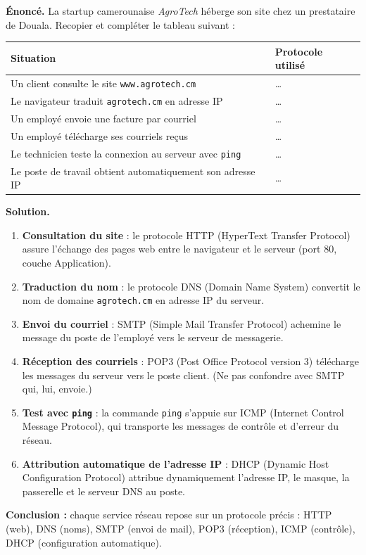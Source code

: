 \documentclass[11pt]{article}
\newcommand{\cle}[1]{{\popxbold\color{popdark}#1}}
\begin{document}
\begin{exoresolu}
\textbf{Énoncé.} La startup camerounaise \emph{AgroTech} héberge son site chez un prestataire de Douala. Recopier et compléter le tableau suivant :
\begin{center}
\begin{tabularx}{\linewidth}{|l|X|}
\hline
\rowcolor{popblueL} \textbf{Situation} & \textbf{Protocole utilisé} \\
\hline Un client consulte le site \texttt{www.agrotech.cm} & \ldots \\
\hline Le navigateur traduit \texttt{agrotech.cm} en adresse IP & \ldots \\
\hline Un employé envoie une facture par courriel & \ldots \\
\hline Un employé télécharge ses courriels reçus & \ldots \\
\hline Le technicien teste la connexion au serveur avec \texttt{ping} & \ldots \\
\hline Le poste de travail obtient automatiquement son adresse IP & \ldots \\
\hline
\end{tabularx}
\end{center}
\tcblower
\textbf{Solution.}
\begin{enumerate}
\item \textbf{Consultation du site} : le protocole \cle{HTTP} (HyperText Transfer Protocol) assure l'échange des pages web entre le navigateur et le serveur (port 80, couche Application).
\item \textbf{Traduction du nom} : le protocole \cle{DNS} (Domain Name System) convertit le nom de domaine \texttt{agrotech.cm} en adresse IP du serveur.
\item \textbf{Envoi du courriel} : \cle{SMTP} (Simple Mail Transfer Protocol) achemine le message du poste de l'employé vers le serveur de messagerie.
\item \textbf{Réception des courriels} : \cle{POP3} (Post Office Protocol version 3) télécharge les messages du serveur vers le poste client. (Ne pas confondre avec SMTP qui, lui, envoie.)
\item \textbf{Test avec \texttt{ping}} : la commande \texttt{ping} s'appuie sur \cle{ICMP} (Internet Control Message Protocol), qui transporte les messages de contrôle et d'erreur du réseau.
\item \textbf{Attribution automatique de l'adresse IP} : \cle{DHCP} (Dynamic Host Configuration Protocol) attribue dynamiquement l'adresse IP, le masque, la passerelle et le serveur DNS au poste.
\end{enumerate}
\textbf{Conclusion :} chaque service réseau repose sur un protocole précis : HTTP (web), DNS (noms), SMTP (envoi de mail), POP3 (réception), ICMP (contrôle), DHCP (configuration automatique).
\end{exoresolu}
\end{document}
